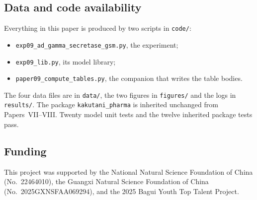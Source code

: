 \documentclass[11pt,reqno]{amsart}
\theoremstyle{plain}
\theoremstyle{definition}
\theoremstyle{remark}
\numberwithin{equation}{section}
\newcommand{\pkg}{\texttt{kakutani\_pharma}}
\begin{document}
\subsection*{Data and code availability}
Everything in this paper is produced by two scripts in \texttt{code/}:
\begin{itemize}[leftmargin=1.6em,itemsep=2pt]
\item \texttt{exp09\_ad\_gamma\_secretase\_gsm.py}, the experiment;
\item \texttt{exp09\_lib.py}, its model library;
\item \texttt{paper09\_compute\_tables.py}, the companion that writes the table bodies.
\end{itemize}
The four data files are in \texttt{data/}, the two figures in \texttt{figures/} and the logs in \texttt{results/}. The package \pkg{} is inherited unchanged from Papers~VII--VIII. Twenty model unit tests and the twelve inherited package tests pass.

\subsection*{Funding}
This project was supported by the National Natural Science Foundation of China (No.~22464010), the Guangxi Natural Science Foundation of China (No.~2025GXNSFAA069294), and the 2025 Bagui Youth Top Talent Project.
\end{document}
